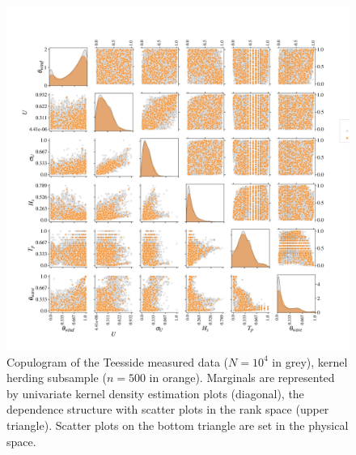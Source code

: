 \begin{figure}[!h]
    \begin{center}
        \includegraphics[width=\linewidth]{part2/figures/DCE/teesside/pairplot_kh.jpg}    
    \end{center}
    \caption{Copulogram of the Teesside measured data ($N=10^4$ in grey), kernel herding subsample ($n=500$ in orange). 
    Marginals are represented by univariate kernel density estimation plots (diagonal), the dependence structure with scatter plots in the rank space (upper triangle). 
    Scatter plots on the bottom triangle are set in the physical space. }
    \label{fig:envi_pairplot}
\end{figure}

